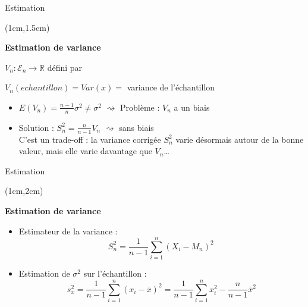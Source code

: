 \documentclass{beamer}
\begin{document}

\begin{frame}{Estimation}
\begin{textblock*}{\textwidth}(1cm,1.5cm)

\begin{center}{\bf \Large Estimation de variance} \end{center}

$V_n : \mathcal{E}_n \longrightarrow \mathbb{R}$ défini par 

\begin{center}
$V_n(echantillon) =  Var(x)=$ variance  de l'échantillon
\end{center}
\vspace{0.3cm}
\begin{itemize}
\item $\displaystyle E(V_n) = \frac{n-1}{n} \sigma^2 \neq \sigma^2$ $\rightsquigarrow$ Problème :  $V_n$ a un biais
\vspace{0.3cm}
\item Solution : $S_n^2=\frac{n}{n-1} V_n$ $\rightsquigarrow$ sans biais \\ \vspace{0.3cm}
C'est un trade-off : la variance corrigée $S_n^2$ varie désormais autour de la bonne valeur, mais elle varie davantage que $V_n$\dots
\end{itemize}
\end{textblock*}

\end{frame}


\begin{frame}{Estimation}
\begin{textblock*}{\textwidth}(1cm,2cm)

\begin{center}{\bf \Large Estimation de variance} \end{center}

\begin{itemize}
\item Estimateur de la variance : 
$$
S^2_n = \frac{1}{n-1} \sum_{i=1}^n (X_i - M_n)^2\,
$$
\item Estimation de $\sigma^2$ sur l'échantillon : 
$$
s^2_x = \frac{1}{n-1} \sum_{i=1}^n (x_i - \overline{x})^2= \frac{1}{n-1}\sum\limits_{i=1}^n x_i^2 - \frac{n}{n-1}\overline{x}^2
$$
\end{itemize}

\end{textblock*}

\end{frame}
\end{document}
